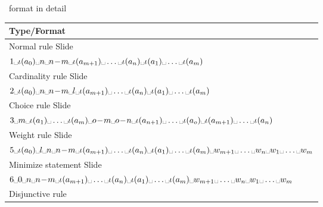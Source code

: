 \begin{frame}[c]{\smodels\ format in detail}
  \footnotesize
  \newcommand{\myspace}{\mbox{\textvisiblespace}}
  \begin{tabular}{|l|}
      \hline
      Type/Format\\
      \hline
      \hline
      Normal rule
      Slide~\pageref{eqn:rule}
      \\
      \(
      1\myspace
      \iota(a_0)\myspace
      n\myspace
      n\!-\!m\myspace
      \iota(a_{m+1})\myspace\dots\myspace\iota(a_{n})\myspace
      \iota(a_1)\myspace\dots\myspace\iota(a_{m})
      \)\\
      \hline
      Cardinality rule
      Slide~\pageref{eqn:cardinality:rule}
      \\
      \(
      2\myspace
      \iota(a_0)\myspace
      n\myspace
      n\!-\!m\myspace
      l\myspace
      \iota(a_{m+1})\myspace\dots\myspace\iota(a_{n})\myspace
      \iota(a_1)\myspace\dots\myspace\iota(a_{m})
      \)\\
      \hline
      Choice rule
      Slide~\pageref{eqn:choice:rule}
      \\
      \(
      3\myspace
      m\myspace
      \iota(a_1)\myspace\dots\myspace\iota(a_{m})\myspace
      o\!-\!m\myspace
      o\!-\!n\myspace
      \iota(a_{n+1})\myspace\dots\myspace\iota(a_{o})\myspace
      \iota(a_{m+1})\myspace\dots\myspace\iota(a_{n})
      \)\\
      \hline
      Weight rule
      Slide~\pageref{eqn:weight:rule}
      \\
      \(
      5\myspace
      \iota(a_0)\myspace
      l\myspace
      n\myspace
      n\!-\!m\myspace
      \iota(a_{m+1})\myspace\dots\myspace\iota(a_{n})\myspace
      \iota(a_1)\myspace\dots\myspace\iota(a_{m})\myspace
      w_{m+1}\myspace\dots\myspace w_n\myspace
      w_1\myspace\dots\myspace w_m
      \)\\
      \hline
      Minimize statement\footnotemark
      Slide~\pageref{eq:minimize}
      \\
      \(
      6\myspace
      0\myspace
      n\myspace
      n\!-\!m\myspace
      \iota(a_{m+1})\myspace\dots\myspace\iota(a_{n})\myspace
      \iota(a_1)\myspace\dots\myspace\iota(a_{m})\myspace
      w_{m+1}\myspace\dots\myspace w_n\myspace
      w_1\myspace\dots\myspace w_m
      \)\\
      \hline
      Disjunctive rule

\end{tabular}
\end{frame}
